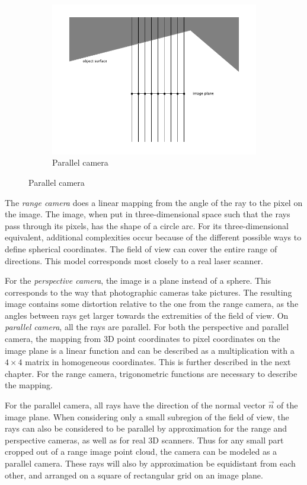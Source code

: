 \begin{figure}[H]
\begin{subfigure}{.33\textwidth}
	\includegraphics[trim=8mm 1cm 8mm 1cm, crop, width=\linewidth]{fig/cam_parallel.pdf}
	\caption{Parallel camera}
\end{subfigure}
\end{figure}

The \emph{range camera} does a linear mapping from the angle of the ray to the pixel on the image. The image, when put in three-dimensional space such that the rays pass through its pixels, has the shape of a circle arc. For its three-dimensional equivalent, additional complexities occur because of the different possible ways to define spherical coordinates. The field of view can cover the entire range of directions. This model corresponds most closely to a real laser scanner.

For the \emph{perspective camera}, the image is a plane instead of a sphere. This corresponds to the way that photographic cameras take pictures. The resulting image contains some distortion relative to the one from the range camera, as the angles between rays get larger towards the extremities of the field of view. On \emph{parallel camera}, all the rays are parallel. For both the perspective and parallel camera, the mapping from 3D point coordinates to pixel coordinates on the image plane is a linear function and can be described as a multiplication with a $4 \times 4$ matrix in homogeneous coordinates. This is further described in the next chapter. For the range camera, trigonometric functions are necessary to describe the mapping.

For the parallel camera, all rays have the direction of the normal vector $\vec{n}$ of the image plane. When considering only a small subregion of the field of view, the rays can also be considered to be parallel by approximation for the range and perspective cameras, as well as for real 3D scanners. Thus for any small part cropped out of a range image point cloud, the camera can be modeled as a parallel camera. These rays will also by approximation be equidistant from each other, and arranged on a square of rectangular grid on an image plane.

